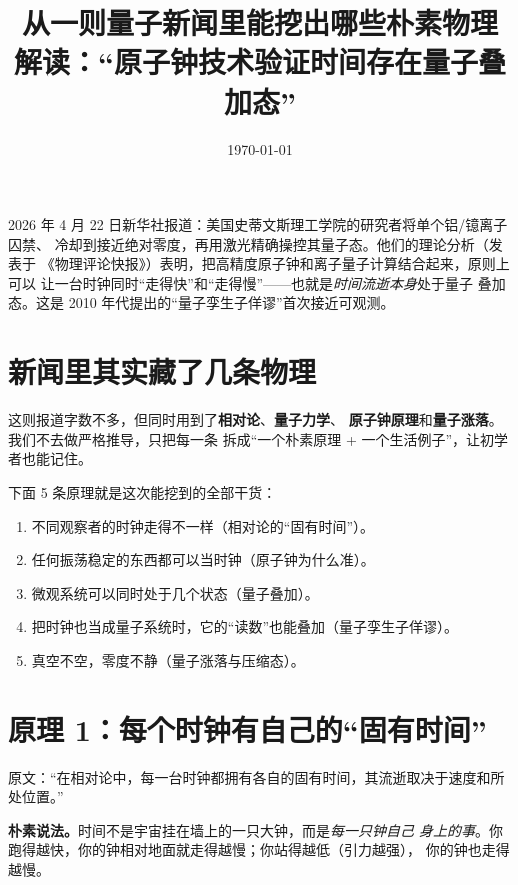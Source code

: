 \documentclass[11pt,a4paper]{ctexart}
\title{从一则量子新闻里能挖出哪些朴素物理\\
  \large 解读：``原子钟技术验证时间存在量子叠加态''}
\author{}
\date{\today}
\begin{document}
\maketitle

\begin{newsblock}
2026 年 4 月 22 日新华社报道：美国史蒂文斯理工学院的研究者将单个铝/镱离子囚禁、
冷却到接近绝对零度，再用激光精确操控其量子态。他们的理论分析（发表于
《物理评论快报》）表明，把高精度原子钟和离子量子计算结合起来，原则上可以
让一台时钟同时``走得快''和``走得慢''——也就是\emph{时间流逝本身}处于量子
叠加态。这是 2010 年代提出的``量子孪生子佯谬''首次接近可观测。
\end{newsblock}

\tableofcontents
\newpage

\section{新闻里其实藏了几条物理}

这则报道字数不多，但同时用到了\textbf{相对论}、\textbf{量子力学}、
\textbf{原子钟原理}和\textbf{量子涨落}。我们不去做严格推导，只把每一条
拆成``一个朴素原理 + 一个生活例子''，让初学者也能记住。

下面 5 条原理就是这次能挖到的全部干货：

\begin{enumerate}[label=\textbf{原理\arabic*.}]
  \item 不同观察者的时钟走得不一样（相对论的``固有时间''）。
  \item 任何振荡稳定的东西都可以当时钟（原子钟为什么准）。
  \item 微观系统可以同时处于几个状态（量子叠加）。
  \item 把时钟也当成量子系统时，它的``读数''也能叠加（量子孪生子佯谬）。
  \item 真空不空，零度不静（量子涨落与压缩态）。
\end{enumerate}

\section{原理 1：每个时钟有自己的``固有时间''}

\begin{newsblock}
原文：``在相对论中，每一台时钟都拥有各自的固有时间，其流逝取决于速度和所处位置。''
\end{newsblock}

\begin{intuitionblock}
\textbf{朴素说法。}时间不是宇宙挂在墙上的一只大钟，而是\emph{每一只钟自己
身上的事}。你跑得越快，你的钟相对地面就走得越慢；你站得越低（引力越强），
你的钟也走得越慢。
\end{intuitionblock}
\end{document}
